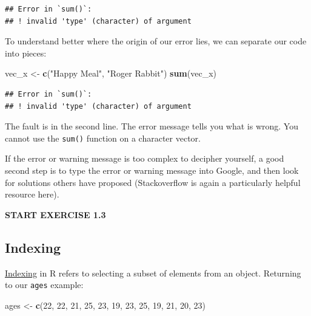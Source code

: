 \documentclass[
]{book}
\newenvironment{Shaded}{\begin{snugshade}}{\end{snugshade}}
\newcommand{\DecValTok}[1]{\textcolor[rgb]{0.00,0.00,0.81}{#1}}
\newcommand{\FunctionTok}[1]{\textcolor[rgb]{0.13,0.29,0.53}{\textbf{#1}}}
\newcommand{\NormalTok}[1]{#1}
\newcommand{\OtherTok}[1]{\textcolor[rgb]{0.56,0.35,0.01}{#1}}
\newcommand{\StringTok}[1]{\textcolor[rgb]{0.31,0.60,0.02}{#1}}
\begin{document}
\begin{verbatim}
## Error in `sum()`:
## ! invalid 'type' (character) of argument
\end{verbatim}

To understand better where the origin of our error lies, we can separate our code into pieces:

\begin{Shaded}
\begin{Highlighting}[]
\NormalTok{vec\_x }\OtherTok{\textless{}{-}} \FunctionTok{c}\NormalTok{(}\StringTok{"Happy Meal"}\NormalTok{, }\StringTok{"Roger Rabbit"}\NormalTok{)}
\FunctionTok{sum}\NormalTok{(vec\_x)}
\end{Highlighting}
\end{Shaded}

\begin{verbatim}
## Error in `sum()`:
## ! invalid 'type' (character) of argument
\end{verbatim}

The fault is in the second line. The error message tells you what is wrong. You cannot use the \texttt{sum()} function on a character vector.

If the error or warning message is too complex to decipher yourself, a good second step is to type the error or warning message into Google, and then look for solutions others have proposed (Stackoverflow is again a particularly helpful resource here).

\textbf{START EXERCISE 1.3}

\subsection{Indexing}\label{indexing}

\ul{Indexing} in R refers to selecting a subset of elements from an object. Returning to our \texttt{ages} example:

\begin{Shaded}
\begin{Highlighting}[]
\NormalTok{ages }\OtherTok{\textless{}{-}} \FunctionTok{c}\NormalTok{(}\DecValTok{22}\NormalTok{, }\DecValTok{22}\NormalTok{, }\DecValTok{21}\NormalTok{, }\DecValTok{25}\NormalTok{, }\DecValTok{23}\NormalTok{, }\DecValTok{19}\NormalTok{, }\DecValTok{23}\NormalTok{, }\DecValTok{25}\NormalTok{, }\DecValTok{19}\NormalTok{, }\DecValTok{21}\NormalTok{, }\DecValTok{20}\NormalTok{, }\DecValTok{23}\NormalTok{)}
\end{Highlighting}
\end{Shaded}
\end{document}
